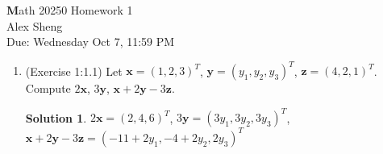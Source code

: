 \documentclass[]{book}
\theoremstyle{definition}
\newtheorem*{soln}{Solution}
\newcommand{\x}{\mathbf{x}}
\newcommand{\y}{\mathbf{y}}
\newcommand{\z}{\mathbf{z}}
\newcommand{\0}{\mathbf{0}}
\begin{document}
\begin{center}
{\Large\textbf Math 20250 \hspace{0.5cm} Homework 1}\\
\large{Alex Sheng}\\
\normalsize{Due: Wednesday Oct 7, 11:59 PM}
\end{center}

\vspace{0.2 cm}

\begin{enumerate}
\item (Exercise 1:1.1)
Let $\x=(1,2,3)^T$, $\y=(y_1,y_2,y_3)^T$, $\z=(4,2,1)^T$. Compute $2\x$, $3\y$, $\x+2\y-3\z$.
\begin{soln}
	$2\x=(2,4,6)^T$, $3\y=(3y_1,3y_2,3y_3)^T$, $\x+2\y-3\z=(-11+2y_1,-4+2y_2,2y_3)^T$
\end{soln}


\end{enumerate}
\end{document}
